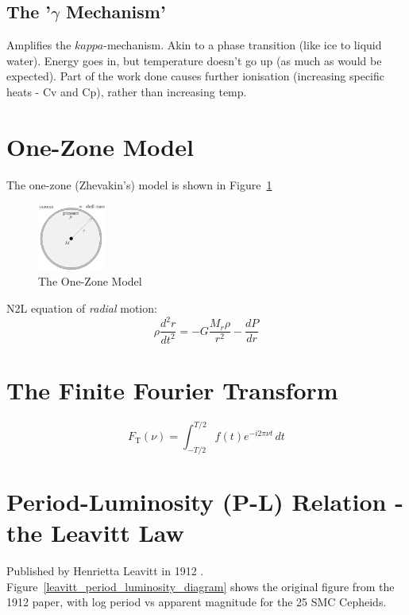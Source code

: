 \documentclass{spy}
\begin{document}
\subsection{The '\(\gamma\) Mechanism'}
Amplifies the \(kappa\)-mechanism. Akin to a phase transition (like ice to liquid water). Energy goes in, but temperature doesn't go up (as much as would be expected). Part of the work done causes further ionisation (increasing specific heats - Cv and Cp), rather than increasing temp.

\section{One-Zone Model}
The one-zone (Zhevakin's) model is shown in Figure~\ref{one_zone_model_diagram}

\begin{figure}[h]
    \centering
    \includegraphics[width=0.2\textwidth]{one_zone_model.eps}
    \caption{The One-Zone Model} 
    \label{one_zone_model_diagram}
\end{figure}

N2L equation of \textit{radial} motion:
\begin{equation}
    \rho \frac{d^2r}{dt^2} = -G \frac{M_r \rho}{r^2} - \frac{dP}{dr}
\end{equation}



\section{The Finite Fourier Transform}
\begin{equation}
F_\mathrm{T}(\nu) = \int_{-T/2}^{T/2} f(t)e^{-i 2\pi \nu t} \,dt
\end{equation}

\section{Period-Luminosity (P-L) Relation - the Leavitt Law}

Published by Henrietta Leavitt in 1912 \citep{leavittPeriods25Variable1912}. Figure~\ref{leavitt_period_luminosity_diagram} shows the original figure from the 1912 paper, with log period vs apparent magnitude for the 25 SMC Cepheids.
\end{document}
